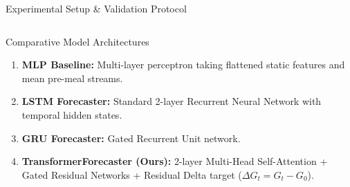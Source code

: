 \documentclass[10pt,aspectratio=169]{beamer}
\begin{document}
\begin{frame}{Experimental Setup \& Validation Protocol}
\begin{columns}
        \begin{block}{Comparative Model Architectures}
            \begin{enumerate}
                \justifying
                \item \textbf{MLP Baseline:} Multi-layer perceptron taking flattened static features and mean pre-meal streams.
                \item \textbf{LSTM Forecaster:} Standard 2-layer Recurrent Neural Network with temporal hidden states.
                \item \textbf{GRU Forecaster:} Gated Recurrent Unit network.
                \item \textbf{TransformerForecaster (Ours):} 2-layer Multi-Head Self-Attention + Gated Residual Networks + Residual Delta target ($\Delta G_t = G_t - G_0$).
            \end{enumerate}
        \end{block}
    \end{columns}
\end{frame}
\end{document}
